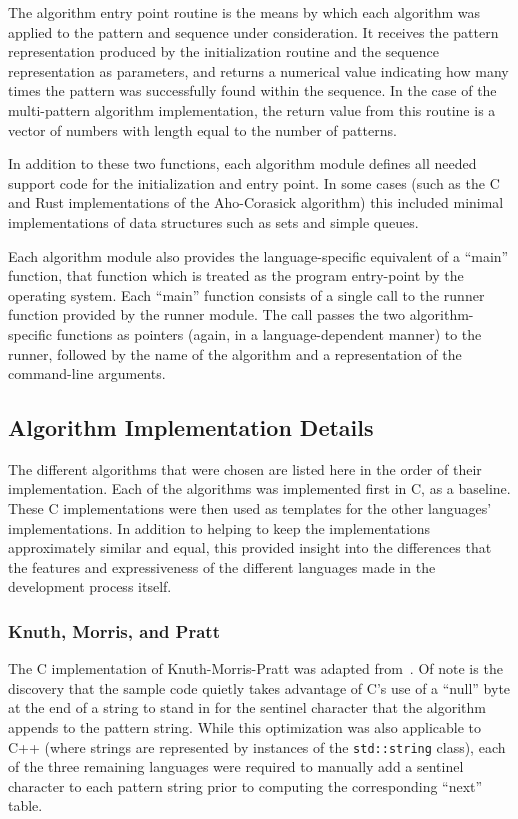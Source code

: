 The algorithm entry point routine is the means by which each algorithm was applied to the pattern and sequence under consideration. It receives the pattern representation produced by the initialization routine and the sequence representation as parameters, and returns a numerical value indicating how many times the pattern was successfully found within the sequence. In the case of the multi-pattern algorithm implementation, the return value from this routine is a vector of numbers with length equal to the number of patterns.

In addition to these two functions, each algorithm module defines all needed support code for the initialization and entry point. In some cases (such as the C and Rust implementations of the Aho-Corasick algorithm) this included minimal implementations of data structures such as sets and simple queues.

Each algorithm module also provides the language-specific equivalent of a ``main'' function, that function which is treated as the program entry-point by the operating system. Each ``main'' function consists of a single call to the runner function provided by the runner module. The call passes the two algorithm-specific functions as pointers (again, in a language-dependent manner) to the runner, followed by the name of the algorithm and a representation of the command-line arguments.

\subsection{Algorithm Implementation Details}

The different algorithms that were chosen are listed here in the order of their implementation. Each of the algorithms was implemented first in C, as a baseline. These C implementations were then used as templates for the other languages' implementations. In addition to helping to keep the implementations approximately similar and equal, this provided insight into the differences that the features and expressiveness of the different languages made in the development process itself.

\subsubsection{Knuth, Morris, and Pratt}

The C implementation of Knuth-Morris-Pratt was adapted from~\cite[Chapter 7]{handbook}. Of note is the discovery that the sample code quietly takes advantage of C's use of a ``null'' byte at the end of a string to stand in for the sentinel character that the algorithm appends to the pattern string. While this optimization was also applicable to C++ (where strings are represented by instances of the \texttt{std::string} class), each of the three remaining languages were required to manually add a sentinel character to each pattern string prior to computing the corresponding ``next'' table.

